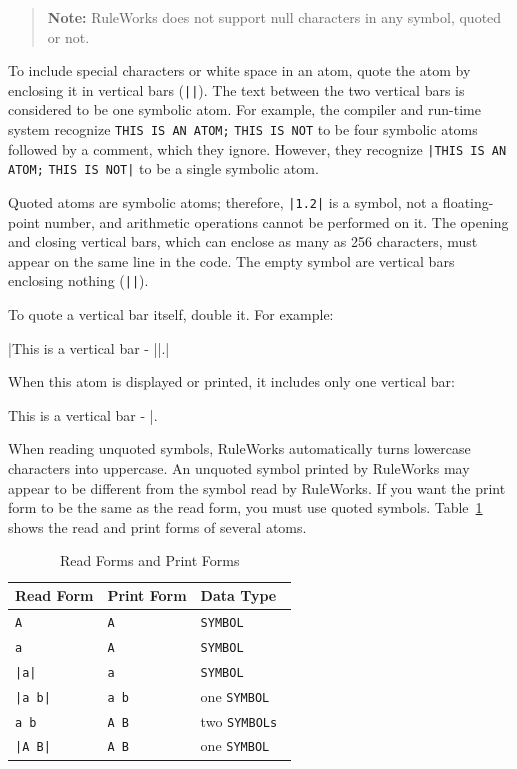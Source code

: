 \begin{quote}
  \textbf{Note:} RuleWorks does not support null characters in any
  symbol, quoted or not.
\end{quote}

To include special characters or white space in an atom, quote the
atom by enclosing it in vertical bars (\verb,||,). The text between
the two vertical bars is considered to be one symbolic atom. For
example, the compiler and run-time system recognize
\verb|THIS IS AN ATOM;| \verb|THIS IS NOT| to be four symbolic atoms followed
by a comment, which they ignore. However, they recognize
\verb,|THIS IS AN ATOM;, \verb,THIS IS NOT|, to be a single symbolic
atom.

Quoted atoms are symbolic atoms; therefore, \verb,|1.2|, is a symbol,
not a floating-point number, and arithmetic operations cannot be
performed on it. The opening and closing vertical bars, which can
enclose as many as 256 characters, must appear on the same line in the
code. The empty symbol are vertical bars enclosing nothing
(\verb,||,).

To quote a vertical bar itself, double it. For example:
\begin{qv}
|This is a vertical bar - ||.|
\end{qv}
When this atom is displayed or printed, it includes only one
vertical bar:
\begin{qv}
This is a vertical bar - |.
\end{qv}
When reading unquoted symbols, RuleWorks automatically turns lowercase
characters into uppercase. An unquoted symbol printed by RuleWorks may
appear to be different from the symbol read by RuleWorks. If you want
the print form to be the same as the read form, you must use quoted
symbols. Table~\ref{t:2-4} shows the read and print forms of several atoms.

\begin{table}[h]
  \centering
  \begin{tabular}{lll}
    \toprule
    Read Form & Print Form & Data Type \\
    \midrule
    \verb,A, &  \verb,A, & \tt{SYMBOL} \\
    \verb,a,        & \verb,A,          & \tt{SYMBOL} \\
    \verb,|a|,       & \verb,a,          & \tt{SYMBOL} \\
    \verb,|a b|,     & \verb,a b,        & one \tt{SYMBOL} \\
    \verb,a b,       & \verb,A B,        & two \tt{SYMBOL}s \\
    \verb,|A B|,     & \verb,A B,        & one \tt{SYMBOL} \\
  \bottomrule
  \end{tabular}
  \caption{Read Forms and Print Forms}
  \label{t:2-4}
\end{table}

